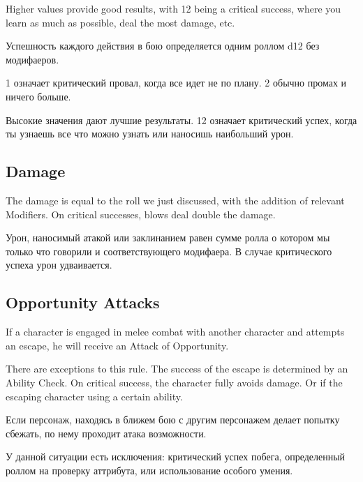 \documentclass[a5paper,11pt]{book}
\begin{document}
\begin{multicols}{2}
\begin{en}
Higher values provide good results, with 12 being a critical success, where you learn as much as possible, deal the most damage, etc.
\end{en}

\begin{ru}
Успешность каждого действия в бою определяется одним роллом d12 без модифаеров.

1 означает критический провал, когда все идет не по плану. 2 обычно промах и ничего больше.

Высокие значения дают лучшие результаты. 12 означает критический успех, когда ты узнаешь все что можно узнать или наносишь наибольший урон.
\end{ru}

\subsection{Damage}
\begin{en}
The damage is equal to the roll we just discussed, with the addition of relevant Modifiers. On critical successes, blows deal double the damage.
\end{en}

\begin{ru}
Урон, наносимый атакой или заклинанием равен сумме ролла о котором мы только что говорили и соответствующего модифаера. В случае критического успеха урон удваивается.
\end{ru}

\subsection{Opportunity Attacks}
\begin{en}
If a character is engaged in melee combat with another character and attempts an escape, he will receive an Attack of Opportunity.

There are exceptions to this rule. The success of the escape is determined by an Ability Check. On critical success, the character fully avoids damage. Or if the escaping character using a certain ability.
\end{en}

\begin{ru}
Если персонаж, находясь в ближем бою с другим персонажем делает попытку сбежать, по нему проходит атака возможности.

У данной ситуации есть исключения: критический успех побега, определенный роллом на проверку аттрибута, или использование особого умения.
\end{ru}


\end{multicols}
\end{document}
